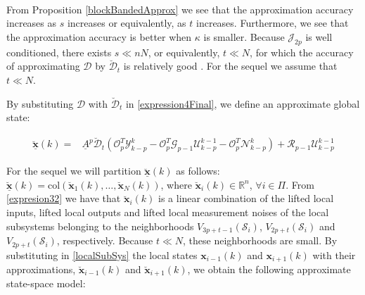 \documentclass[journal,10pt]{IEEEtran}
\begin{document}
\\
From Proposition \ref{blockBandedApprox} we see that the approximation accuracy increases as $s$ increases or equivalently, as  $t$ increases. Furthermore, we see that the approximation accuracy is better when $\kappa$ is smaller. Because $\mathcal{J}_{2p}$ is well conditioned, there exists $s\ll nN$, or equivalently, $t\ll N$, for which the accuracy of approximating $\mathcal{D}$ by $\breve{\mathcal{D}}_{t}$ is relatively good \cite{benzi2007}. For the sequel we assume that $t\ll N$.
\par
By substituting $\mathcal{D}$ with $\breve{\mathcal{D}}_{t}$ in \eqref{expression4Final}, we define an approximate global state:
\begin{small} 
\begin{align}
 \breve{\underline{\mathbf{x}}}(k)=& \underline{A}^{p}\breve{\mathcal{D}}_{t}\left(\mathcal{O}_{p}^{T}\mathcal{Y}_{k-p}^{k}-\mathcal{O}_{p}^{T}\mathcal{G}_{p-1}\mathcal{U}_{k-p}^{k-1}-\mathcal{O}_{p}^{T}\mathcal{N}_{k-p}^{k}\right) +\mathcal{R}_{p-1}\mathcal{U}_{k-p}^{k-1}
\label{expresion32}
\end{align}
\end{small}
 For the sequel we will partition $\breve{\underline{\mathbf{x}}}(k)$ as follows: $\breve{\underline{\mathbf{x}}}(k)=\text{col}(\breve{\mathbf{x}}_{1}(k),\ldots,\breve{\mathbf{x}}_{N}(k))$, where $\breve{\mathbf{x}}_{i}(k)\in \mathbb{R}^{n}$,  $\forall i\in \Pi$. From \eqref{expresion32} we have that $\breve{\mathbf{x}}_{i}(k)$ is a linear combination of the lifted local inputs, lifted local outputs and lifted local measurement noises of the local subsystems belonging to the neighborhoods $V_{3p+t-1}\left(\mathcal{S}_{i}\right)$, $V_{2p+t}\left(\mathcal{S}_{i}\right)$ and $V_{2p+t}\left(\mathcal{S}_{i}\right)$, respectively. 
Because $t\ll N$, these neighborhoods are small. By substituting in \eqref{localSubSys} the local states $\mathbf{x}_{i-1}(k)$ and $\mathbf{x}_{i+1}(k)$ with their approximations, $\breve{\mathbf{x}}_{i-1}(k)$ and $\breve{\mathbf{x}}_{i+1}(k)$, we obtain the following approximate state-space model:
\end{document}
